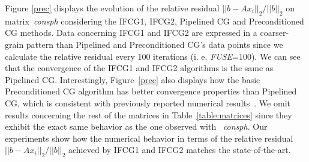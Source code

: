 Figure \ref{prec} displays the evolution of the relative residual $||b-Ax_{i}||_{2}/||b||_{2}$ on matrix~\emph{consph} considering the IFCG1, IFCG2, Pipe\-lined CG and Preconditioned CG methods.
Data concerning IFCG1 and IFCG2 are expressed in a coarser-grain pattern than Pipelined and Preconditioned CG's data points since we calculate the relative residual every 100 iterations (i. e. \emph{FUSE}=100).
We can see that the convergence of the IFCG1 and IFCG2 algorithms is the same as Pipelined CG.
Interestingly, Figure~\ref{prec} also displays how the basic Preconditioned CG algorithm has better convergence properties than Pipelined CG, which is consistent with previously reported numerical results~\cite{ghysels14, cools16}.
We omit results concerning the rest of the matrices in Table~\ref{table:matrices} since they exhibit the exact same behavior as the one observed with ~\emph{consph}.
Our experiments show how the numerical behavior in terms of the relative residual $||b-Ax_{i}||_{2}/||b||_{2}$ achieved by IFCG1 and IFCG2 matches the state-of-the-art. 
